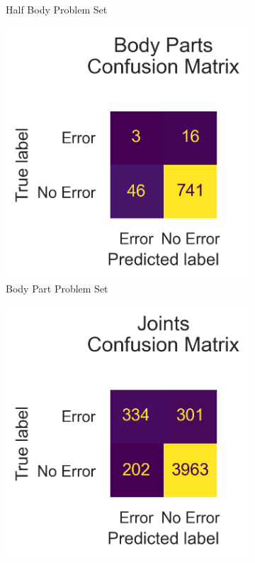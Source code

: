 \begin{figure}[htbp]
\begin{subfigure}[b]{0.35\linewidth}
      \caption{Half Body Problem Set}
      \label{fig:hi_hb_conf}
  \end{subfigure}
  \hfill
  \begin{subfigure}[b]{0.35\linewidth}
      \centering
      \includegraphics[width=\textwidth]{figures/results_hi/v2/confusion/body_parts_together.png}
      \caption{Body Part Problem Set}
      \label{fig:hi_bp_conf}
  \end{subfigure}
  \hfill
  \begin{subfigure}[b]{0.35\linewidth}
      \centering
      \includegraphics[width=\textwidth]{figures/results_hi/v2/confusion/joints_together.png}

\end{subfigure}
\end{figure}
